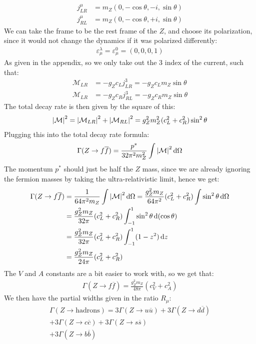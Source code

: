 \documentclass[12pt]{article}
\newcommand{\M}{\mathcal{M}}
\newcommand{\veps}{\varepsilon}
\begin{document}
\begin{align*}
  j^\mu_{LR}&=m_Z(0,-\cos\theta,-i,\sin\theta)\\
  j^\mu_{RL}&=m_Z(0,-\cos\theta,+i,\sin\theta)
\end{align*}
We can take the frame to be the rest frame of the $Z$, and choose its polarization, since it would not change the dynamics if it was polarized differently:
\begin{align*}
  \veps^\lambda_\mu=\veps^0_\mu=(0,0,0,1)
\end{align*}
As given in the appendix, so we only take out the $3$ index of the current, such that:
\begin{align*}
  \M_{LR}&=-g_Z c_L j^3_{LR}=-g_Z c_L m_Z\sin\theta\\
  \M_{LR}&=-g_Z c_R j^3_{RL}=-g_Z c_R  m_Z\sin\theta
\end{align*}
The total decay rate is then given by the square of this:
\begin{align*}
  \abs{\M}^2=\abs{\M_{LR}}^2+\abs{\M_{RL}}^2=g_Z^2m_Z^2(c_L^2+c_R^2)\sin^2\theta
\end{align*}
Plugging this into the total decay rate formula:
\begin{align*}
  \Gamma(Z\to f\overline{f})=\frac{p^*}{32\pi^2m_Z^2}\int\abs{\M}^2\dd{\Omega}
\end{align*}
The momentum $p^*$ should just be half the $Z$ mass, since we are already ignoring the fermion masses by taking the ultra-relativistic limit, hence we get:
\begin{align*}
  \Gamma(Z\to f\overline{f})&=\frac1{64\pi^2m_Z}\int\abs{\M}^2\dd{\Omega}
  =\frac{g_Z^2m_Z}{64\pi^2}(c_L^2+c_R^2)\int\sin^2\theta\dd{\Omega}\\
  &=\frac{g_Z^2m_Z}{32\pi}(c_L^2+c_R^2)
  \int_{-1}^1\sin^2\theta\dd{(\cos\theta)}\\
  &=\frac{g_Z^2m_Z}{32\pi}(c_L^2+c_R^2)
  \int_{-1}^1(1-z^2)\dd{z}\\
  &=\frac{g_Z^2m_Z}{24\pi}(c_L^2+c_R^2)
\end{align*}
The $V$ and $A$ constants are a bit easier to work with, so we get that:
\begin{align*}
  \Gamma(Z\to f\overline{f})=\frac{g_Z^2m_Z}{48\pi}(c_V^2+c_A^2)
\end{align*}
We then have the partial widths given in the ratio $R_\mu$:
\begin{align*}
  \Gamma(Z\to\text{hadrons})=
  3\Gamma(Z\to u\overline{u})+3\Gamma(Z\to d\overline{d})\\+
  3\Gamma(Z\to c\overline{c})+3\Gamma(Z\to s\overline{s})\\+
  3\Gamma(Z\to b\overline{b})
\end{align*}
\end{document}
